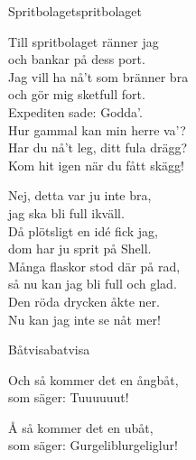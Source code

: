 \begin{song}{Spritbolaget}{spritbolaget}
\begin{vers}
Till spritbolaget ränner jag\\
och bankar på dess port.\\
Jag vill ha nå't som bränner bra\\
och gör mig sketfull fort.\\
Expediten sade: Godda'.\\
Hur gammal kan min herre va'?\\
Har du nå't leg, ditt fula drägg?\\
Kom hit igen när du fått skägg!\\
\end{vers}
\begin{vers}
Nej, detta var ju inte bra,\\
jag ska bli full ikväll.\\
Då plötsligt en idé fick jag,\\
dom har ju sprit på Shell.\\
Många flaskor stod där på rad,\\
så nu kan jag bli full och glad.\\
Den röda drycken åkte ner.\\
Nu kan jag inte se nåt mer!\\
\end{vers}
\end{song}

\newpage

\begin{song}{Båtvisa}{batvisa}
\begin{vers}
Och så kommer det en ångbåt,   \\
som säger: Tuuuuuut!\\
\end{vers}
\begin{vers}
Å så kommer det en ubåt,\\
som säger: Gurgeliblurgeliglur!\\
\end{vers}
\end{song}

